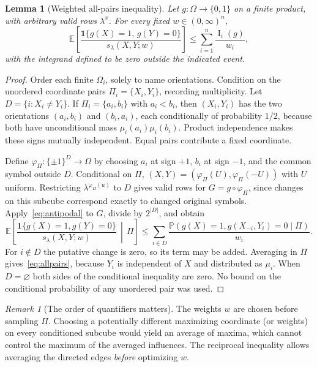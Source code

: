 \documentclass[11pt]{article}
\numberwithin{equation}{section}
\newtheorem{lemma}[theorem]{Lemma}
\theoremstyle{remark}
\newtheorem{remark}[theorem]{Remark}
\newcommand{\E}{\mathbb E}
\newcommand{\Prb}{\mathbb P}
\newcommand{\one}{\mathbf 1}
\newcommand{\Inf}{\operatorname{I}}
\begin{document}
\begin{lemma}[Weighted all-pairs inequality]\label{lem:allpairs}
Let $g:\Omega\to\{0,1\}$ on a finite product, with arbitrary valid rows $\lambda^x$. For every \emph{fixed} $w\in(0,\infty)^n$,
\begin{equation}\label{eq:allpairs}
 \E\left[\frac{\one\{g(X)=1,\,g(Y)=0\}}
 {s_\lambda(X,Y;w)}\right]
 \le\sum_{i=1}^n\frac{\Inf_i(g)}{w_i},
\end{equation}
with the integrand defined to be zero outside the indicated event.
\end{lemma}
\begin{proof}
Order each finite $\Omega_i$, solely to name orientations. Condition on the unordered coordinate pairs $\Pi_i=\{X_i,Y_i\}$, recording multiplicity. Let $D=\{i:X_i\ne Y_i\}$. If $\Pi_i=\{a_i,b_i\}$ with $a_i<b_i$, then $(X_i,Y_i)$ has the two orientations $(a_i,b_i)$ and $(b_i,a_i)$, each conditionally of probability $1/2$, because both have unconditional mass $\mu_i(a_i)\mu_i(b_i)$. Product independence makes these signs mutually independent. Equal pairs contribute a fixed coordinate.

Define $\varphi_\Pi:\{\pm1\}^{D}\to\Omega$ by choosing $a_i$ at sign $+1$, $b_i$ at sign $-1$, and the common symbol outside $D$. Conditional on $\Pi$, $(X,Y)=(\varphi_\Pi(U),\varphi_\Pi(-U))$ with $U$ uniform. Restricting $\lambda^{\varphi_\Pi(u)}$ to $D$ gives valid rows for $G=g\circ\varphi_\Pi$, since changes on this subcube correspond exactly to changed original symbols. Apply~\eqref{eq:antipodal} to $G$, divide by $2^{|D|}$, and obtain
\[
 \E\left[\frac{\one\{g(X)=1,g(Y)=0\}}{s_\lambda(X,Y;w)}\,\middle|\,\Pi\right]
 \le\sum_{i\in D}\frac{\Prb(g(X)=1,g(X_{-i},Y_i)=0\mid\Pi)}{w_i}.
\]
For $i\notin D$ the putative change is zero, so its term may be added. Averaging in $\Pi$ gives~\eqref{eq:allpairs}, because $Y_i$ is independent of $X$ and distributed as $\mu_i$. When $D=\varnothing$ both sides of the conditional inequality are zero. No bound on the conditional probability of any unordered pair was used.
\end{proof}

\begin{remark}[The order of quantifiers matters]
The weights $w$ are chosen before sampling $\Pi$. Choosing a potentially different maximizing coordinate (or weights) on every conditioned subcube would yield an average of maxima, which cannot control the maximum of the averaged influences. The reciprocal inequality allows averaging the directed edges \emph{before} optimizing $w$.
\end{remark}
\end{document}
